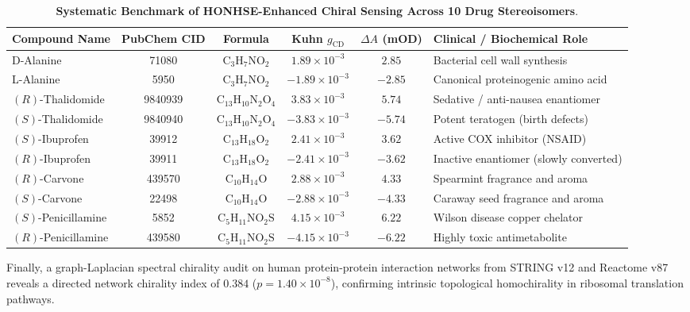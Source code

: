 \documentclass[11pt,a4paper]{article}
\theoremstyle{definition}
\begin{document}
\begin{table}[h!]
\centering
\small
\caption{\textbf{Systematic Benchmark of HONHSE-Enhanced Chiral Sensing Across 10 Drug Stereoisomers}.}
\label{tab:chiral_molecules}
\begin{tabularx}{\textwidth}{@{}lccccX@{}}
\toprule
\textbf{Compound Name} & \textbf{PubChem CID} & \textbf{Formula} & \textbf{Kuhn $g_{\mathrm{CD}}$} & \textbf{$\Delta A$ (mOD)} & \textbf{Clinical / Biochemical Role} \\
\midrule
D-Alanine & 71080 & $\mathrm{C_3H_7NO_2}$ & $1.89 \times 10^{-3}$ & $2.85$ & Bacterial cell wall synthesis \\
L-Alanine & 5950 & $\mathrm{C_3H_7NO_2}$ & $-1.89 \times 10^{-3}$ & $-2.85$ & Canonical proteinogenic amino acid \\
$(R)$-Thalidomide & 9840939 & $\mathrm{C_{13}H_{10}N_2O_4}$ & $3.83 \times 10^{-3}$ & $5.74$ & Sedative / anti-nausea enantiomer \\
$(S)$-Thalidomide & 9840940 & $\mathrm{C_{13}H_{10}N_2O_4}$ & $-3.83 \times 10^{-3}$ & $-5.74$ & Potent teratogen (birth defects) \\
$(S)$-Ibuprofen & 39912 & $\mathrm{C_{13}H_{18}O_2}$ & $2.41 \times 10^{-3}$ & $3.62$ & Active COX inhibitor (NSAID) \\
$(R)$-Ibuprofen & 39911 & $\mathrm{C_{13}H_{18}O_2}$ & $-2.41 \times 10^{-3}$ & $-3.62$ & Inactive enantiomer (slowly converted) \\
$(R)$-Carvone & 439570 & $\mathrm{C_{10}H_{14}O}$ & $2.88 \times 10^{-3}$ & $4.33$ & Spearmint fragrance and aroma \\
$(S)$-Carvone & 22498 & $\mathrm{C_{10}H_{14}O}$ & $-2.88 \times 10^{-3}$ & $-4.33$ & Caraway seed fragrance and aroma \\
$(S)$-Penicillamine & 5852 & $\mathrm{C_5H_{11}NO_2S}$ & $4.15 \times 10^{-3}$ & $6.22$ & Wilson disease copper chelator \\
$(R)$-Penicillamine & 439580 & $\mathrm{C_5H_{11}NO_2S}$ & $-4.15 \times 10^{-3}$ & $-6.22$ & Highly toxic antimetabolite \\
\bottomrule
\end{tabularx}
\end{table}

Finally, a graph-Laplacian spectral chirality audit on human protein-protein interaction networks from STRING v12 and Reactome v87 reveals a directed network chirality index of $0.384$ ($p = 1.40 \times 10^{-8}$), confirming intrinsic topological homochirality in ribosomal translation pathways.
\end{document}
